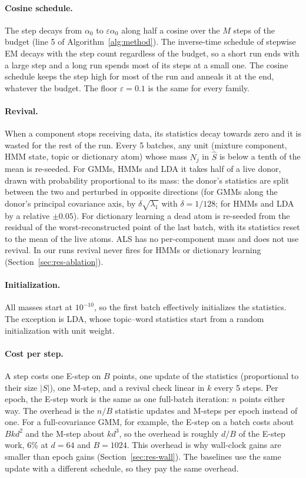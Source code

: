 \documentclass[10pt]{article}
\begin{document}
\paragraph{Cosine schedule.} The step decays from $\alpha_0$ to $\varepsilon\alpha_0$ along half a cosine over the
$M$ steps of the budget (line 5 of Algorithm~\ref{alg:method}). The inverse-time schedule of stepwise EM decays with
the step count regardless of the budget, so a short run ends with a large step and a long run spends most of its
steps at a small one. The cosine schedule keeps the step high for most of the run and anneals it at the end, whatever
the budget. The floor $\varepsilon = 0.1$ is the same for every family.

\paragraph{Revival.} When a component stops receiving data, its statistics decay towards zero and it is wasted for
the rest of the run. Every 5 batches, any unit (mixture component, HMM state, topic or dictionary atom) whose mass
$N_j$ in $\hat S$ is below a tenth of the mean is re-seeded. For GMMs, HMMs and LDA it takes half of a live donor,
drawn with probability proportional to its mass: the donor's statistics are split between the two and perturbed in
opposite directions (for GMMs along the donor's principal covariance axis, by $\delta\sqrt{\lambda_1}$ with $\delta =
1/128$; for HMMs and LDA by a relative $\pm 0.05$). For dictionary learning a dead atom is re-seeded from the residual of the
worst-reconstructed point of the last batch, with its statistics reset to the mean of the live atoms. ALS has no per-component mass and does not use revival. In our runs revival never fires for HMMs
or dictionary learning (Section~\ref{sec:res-ablation}).

\paragraph{Initialization.} All masses start at $10^{-10}$, so the first batch effectively initializes the statistics.
The exception is LDA, whose topic--word statistics start from a random initialization with unit weight.

\paragraph{Cost per step.}\label{sec:cost} A step costs one E-step on $B$ points, one update of the statistics
(proportional to their size $|S|$), one M-step, and a revival check linear in $k$ every 5 steps. Per epoch, the E-step
work is the same as one full-batch iteration: $n$ points either way. The overhead is the $n/B$ statistic updates and
M-steps per epoch instead of one. For a full-covariance GMM, for example, the E-step on a batch costs about $Bkd^2$
and the M-step about $kd^3$, so the overhead is roughly $d/B$ of the E-step work, 6\% at $d = 64$ and $B = 1024$. This
overhead is why wall-clock gains are smaller than epoch gains (Section~\ref{sec:res-wall}). The baselines use the same
update with a different schedule, so they pay the same overhead.
\end{document}
